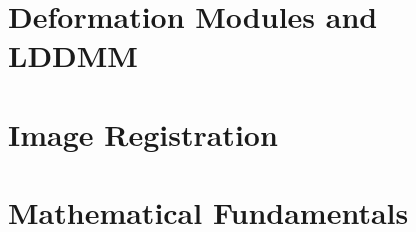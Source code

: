 \documentclass[twoside]{article}
\begin{document}
\section{Deformation Modules and LDDMM}



	



%

\section{Image Registration}






\section{Mathematical Fundamentals}





\end{document}
